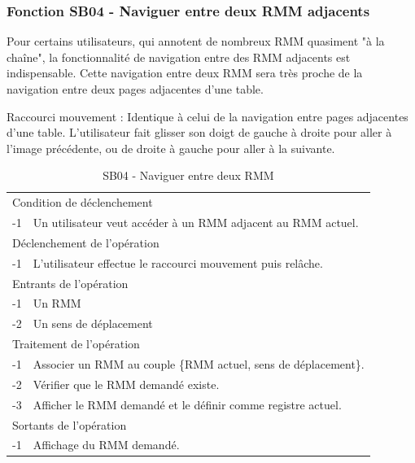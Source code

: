 \documentclass[a4paper]{article}
\begin{document}
\subsubsection{Fonction SB04 - Naviguer entre deux RMM adjacents}

Pour certains utilisateurs, qui annotent de nombreux RMM quasiment "à la chaîne", la fonctionnalité de navigation entre des RMM adjacents est indispensable. Cette navigation entre deux RMM sera très proche de la navigation entre deux pages adjacentes d'une table.

Raccourci mouvement : Identique à celui de la navigation entre pages adjacentes d'une table. L'utilisateur fait glisser son doigt de gauche \`a droite pour aller \`a l'image pr\'ec\'edente, ou de droite \`a gauche pour aller \`a la suivante.

\begin{table}[H]
  \centering
   \small
	\begin{tabular}{|c|p{12cm}|}
   		\hline
   			\rowcolor{lightgray}\multicolumn{2}{|c|}{\textbf{SB04 - Naviguer entre deux RMM adjacents}} \\
   		\hline
   			\multicolumn{2}{|l|}{Condition de d\'eclenchement} \\
   		\hline
   		-1 & Un utilisateur veut acc\'eder \`a un RMM adjacent au RMM actuel. \\
   		\hline
   			\multicolumn{2}{|l|}{D\'eclenchement de l'op\'eration} \\
   		\hline
   			-1 & L'utilisateur effectue le raccourci mouvement puis rel\^ache. \\
   		\hline
   			\multicolumn{2}{|l|}{Entrants de l'op\'eration} \\
   		\hline
   			-1 & Un RMM \\
        	-2 & Un sens de d\'eplacement \\ 
   		\hline
   			\multicolumn{2}{|l|}{Traitement de l'op\'eration} \\
  		\hline
   			-1 & Associer un RMM au couple \{RMM actuel, sens de d\'eplacement\}.  \\
        	-2 & V\'erifier que le RMM demand\'e existe. \\
        	-3 & Afficher le RMM demand\'e et le d\'efinir comme registre actuel. \\
   		\hline
   			\multicolumn{2}{|l|}{Sortants de l'op\'eration} \\
   		\hline
   			-1 & Affichage du RMM demand\'e. \\
   		\hline
	\end{tabular}
  \caption{SB04 - Naviguer entre deux RMM}
  \normalsize
  \label{tab:naviguer_deux_registres_adjacents}
\end{table}
\end{document}

